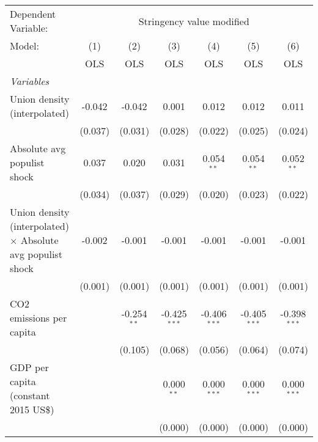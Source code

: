 
\begingroup
\centering
\begin{tabular}{lcccccc}
   \toprule
   Dependent Variable: & \multicolumn{6}{c}{Stringency value modified}\\
   Model:                                                             & (1)     & (2)           & (3)            & (4)            & (5)            & (6)\\  
                                                                      &  OLS    & OLS           & OLS            & OLS            & OLS            & OLS\\  
   \midrule
   \emph{Variables}\\
   Union density (interpolated)                                       & -0.042  & -0.042        & 0.001          & 0.012          & 0.012          & 0.011\\   
                                                                      & (0.037) & (0.031)       & (0.028)        & (0.022)        & (0.025)        & (0.024)\\   
   Absolute avg populist shock                                        & 0.037   & 0.020         & 0.031          & 0.054$^{**}$   & 0.054$^{**}$   & 0.052$^{**}$\\   
                                                                      & (0.034) & (0.037)       & (0.029)        & (0.020)        & (0.023)        & (0.022)\\   
   Union density (interpolated) $\times$ Absolute avg populist shock  & -0.002  & -0.001        & -0.001         & -0.001         & -0.001         & -0.001\\   
                                                                      & (0.001) & (0.001)       & (0.001)        & (0.001)        & (0.001)        & (0.001)\\   
   CO2 emissions per capita                                           &         & -0.254$^{**}$ & -0.425$^{***}$ & -0.406$^{***}$ & -0.405$^{***}$ & -0.398$^{***}$\\   
                                                                      &         & (0.105)       & (0.068)        & (0.056)        & (0.064)        & (0.074)\\   
   GDP per capita (constant 2015 US\$)                                &         &               & 0.000$^{**}$   & 0.000$^{***}$  & 0.000$^{***}$  & 0.000$^{***}$\\   
                                                                      &         &               & (0.000)        & (0.000)        & (0.000)        & (0.000)\\   

\end{tabular}
